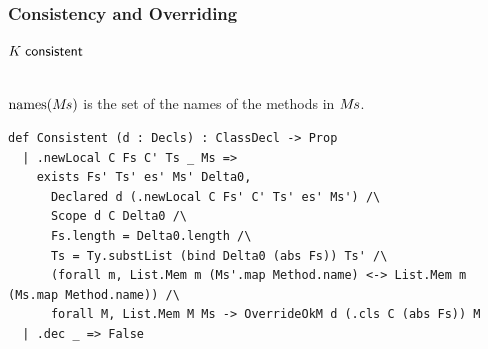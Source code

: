 \subsubsection{Consistency and Overriding}

\begin{cmp}{$K\mskip5mu\mathsf{consistent}$}
\begin{paperside}
\\[1ex]
$\mathrm{names}(M\mkern-2mu s)$ is the set of the names of the methods in $M\mkern-2mu s$.
\end{paperside}
\begin{leanside}
\begin{lstlisting}[style=leanside]
def Consistent (d : Decls) : ClassDecl -> Prop
  | .newLocal C Fs C' Ts _ Ms =>
    exists Fs' Ts' es' Ms' Delta0,
      Declared d (.newLocal C Fs' C' Ts' es' Ms') /\
      Scope d C Delta0 /\
      Fs.length = Delta0.length /\
      Ts = Ty.substList (bind Delta0 (abs Fs)) Ts' /\
      (forall m, List.Mem m (Ms'.map Method.name) <-> List.Mem m (Ms.map Method.name)) /\
      forall M, List.Mem M Ms -> OverrideOkM d (.cls C (abs Fs)) M
  | .dec _ => False
\end{lstlisting}
\end{leanside}
\end{cmp}

